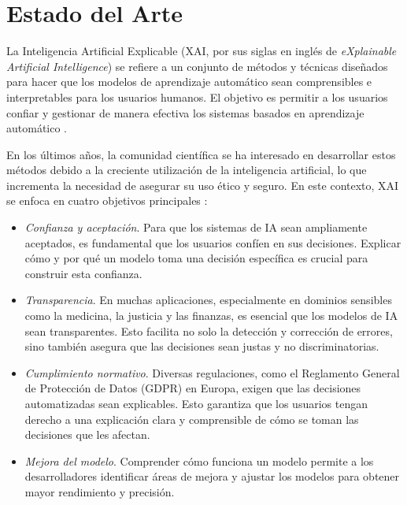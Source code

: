 \chapter{Estado del Arte}

La Inteligencia Artificial Explicable (XAI, por sus siglas en inglés de \emph{eXplainable Artificial Intelligence}) se refiere a un conjunto de métodos y técnicas diseñados para hacer que los modelos de aprendizaje automático sean comprensibles e interpretables para los usuarios humanos. El objetivo es permitir a los usuarios confiar y gestionar de manera efectiva los sistemas basados en aprendizaje automático \cite{gunning2019xai}. 

En los últimos años, la comunidad científica se ha interesado en desarrollar estos métodos debido a la creciente utilización de la inteligencia artificial, lo que incrementa la necesidad de asegurar su uso ético y seguro. En este contexto, XAI se enfoca en cuatro objetivos principales \cite{curso-xai}:

\begin{itemize}
    \item \textit{Confianza y aceptación}. Para que los sistemas de IA sean ampliamente aceptados, es fundamental que los usuarios confíen en sus decisiones. Explicar cómo y por qué un modelo toma una decisión específica es crucial para construir esta confianza.
    
    \item \textit{Transparencia}. En muchas aplicaciones, especialmente en dominios sensibles como la medicina, la justicia y las finanzas, es esencial que los modelos de IA sean transparentes. Esto facilita no solo la detección y corrección de errores, sino también asegura que las decisiones sean justas y no discriminatorias.
    
    \item \textit{Cumplimiento normativo}. Diversas regulaciones, como el Reglamento General de Protección de Datos (GDPR) en Europa, exigen que las decisiones automatizadas sean explicables. Esto garantiza que los usuarios tengan derecho a una explicación clara y comprensible de cómo se toman las decisiones que les afectan.
    
    \item \textit{Mejora del modelo}. Comprender cómo funciona un modelo permite a los desarrolladores identificar áreas de mejora y ajustar los modelos para obtener mayor rendimiento y precisión.
\end{itemize}

